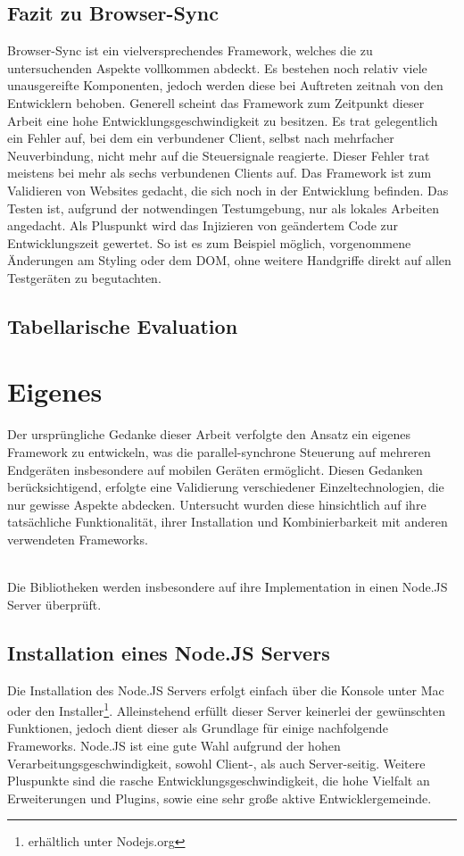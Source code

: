 	\subsection{Fazit zu Browser-Sync}
	Browser-Sync ist ein vielversprechendes Framework, welches die zu untersuchenden Aspekte vollkommen abdeckt. Es bestehen noch relativ viele unausgereifte Komponenten, jedoch werden diese bei Auftreten zeitnah von den Entwicklern behoben. Generell scheint das Framework zum Zeitpunkt dieser Arbeit eine hohe Entwicklungsgeschwindigkeit zu besitzen. Es trat gelegentlich ein Fehler auf, bei dem ein verbundener Client, selbst nach mehrfacher Neuverbindung, nicht mehr auf die Steuersignale reagierte. Dieser Fehler trat meistens bei mehr als sechs verbundenen Clients auf. Das Framework ist zum Validieren von Websites gedacht, die sich noch in der Entwicklung befinden. Das Testen ist, aufgrund der notwendingen Testumgebung, nur als lokales Arbeiten angedacht. Als Pluspunkt wird das Injizieren von geändertem Code zur Entwicklungszeit gewertet. So ist es zum Beispiel möglich, vorgenommene Änderungen am Styling oder dem DOM, ohne weitere Handgriffe direkt auf allen Testgeräten zu begutachten.
	
	\subsection{Tabellarische Evaluation}
	
	
	\section{Eigenes }
	Der ursprüngliche Gedanke dieser Arbeit verfolgte den Ansatz ein eigenes Framework zu entwickeln, was die parallel-synchrone Steuerung auf mehreren Endgeräten insbesondere auf mobilen Geräten ermöglicht. Diesen Gedanken berücksichtigend, erfolgte eine Validierung verschiedener Einzeltechnologien, die nur gewisse Aspekte abdecken. Untersucht wurden diese hinsichtlich auf ihre tatsächliche Funktionalität, ihrer Installation und Kombinierbarkeit mit anderen verwendeten Frameworks.
	
\\Die Bibliotheken werden insbesondere auf ihre Implementation in einen Node.JS Server überprüft.

	\subsection{Installation eines Node.JS Servers}
	Die Installation des Node.JS Servers erfolgt einfach über die Konsole unter Mac oder den Installer\footnote{erhältlich unter Nodejs.org}. Alleinstehend erfüllt dieser Server keinerlei der gewünschten Funktionen, jedoch dient dieser als Grundlage für einige nachfolgende Frameworks. Node.JS ist eine gute Wahl aufgrund der hohen Verarbeitungsgeschwindigkeit, sowohl Client-, als auch Server-seitig. Weitere Pluspunkte sind die rasche Entwicklungsgeschwindigkeit, die hohe Vielfalt an Erweiterungen und Plugins, sowie eine sehr große aktive Entwicklergemeinde.
